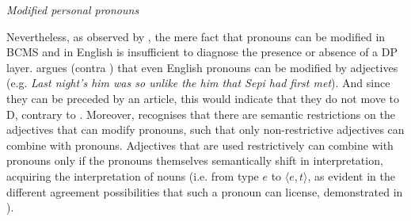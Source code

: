 \documentclass[output=paper,colorlinks,citecolor=brown]{langscibook}
\begin{document}
\ea \label{overtmaterialprecede} \textit{Modified personal pronouns}
\label{overtmaterialprecede1}
\label{overtmaterialprecede2}
\z \z 

\noindent Nevertheless, as observed by \citet{arsenijevicnominalstructure}, the mere fact that pronouns can be modified in BCMS and in English is insufficient to diagnose the presence or absence of a DP layer. 
\citet[13]{arsenijevicnominalstructure} argues (contra \citealt{pus:boskovic08,runic14})  that even English pronouns can be modified by adjectives (e.g. \textit{Last night's him was so unlike the him that Sepi had first met}). And since they can be preceded by an article, this would indicate that they do not move to D, contrary to \citet{dechainewiltschko}. 
Moreover, \citet{arsenijevic-honorific} recognises that there are semantic restrictions on the adjectives that can modify pronouns, such that only non-restrictive adjectives can combine with pronouns. Adjectives that are used restrictively can combine with pronouns only if the pronouns themselves semantically shift in interpretation, acquiring the interpretation of nouns (i.e. from type $e$ to $\langle e, t \rangle$, as evident in the different agreement possibilities that such a pronoun can license, demonstrated in ). 
\end{document}
